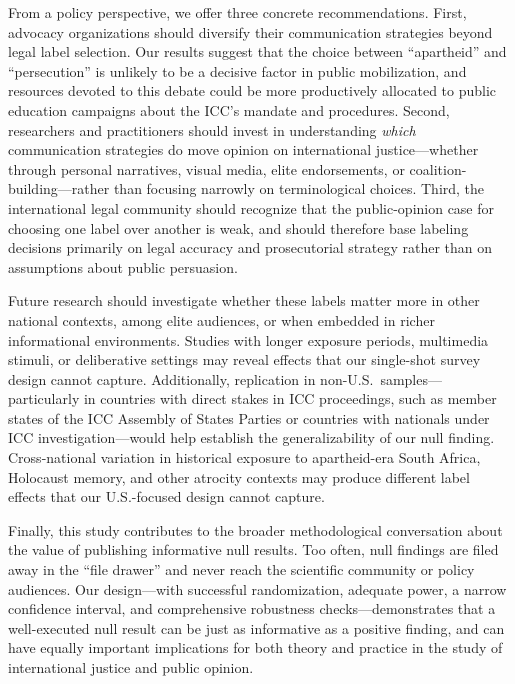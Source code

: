 \documentclass[12pt]{article}
\begin{document}
From a policy perspective, we offer three concrete recommendations. First, advocacy organizations should diversify their communication strategies beyond legal label selection. Our results suggest that the choice between ``apartheid'' and ``persecution'' is unlikely to be a decisive factor in public mobilization, and resources devoted to this debate could be more productively allocated to public education campaigns about the ICC's mandate and procedures. Second, researchers and practitioners should invest in understanding \emph{which} communication strategies do move opinion on international justice---whether through personal narratives, visual media, elite endorsements, or coalition-building---rather than focusing narrowly on terminological choices. Third, the international legal community should recognize that the public-opinion case for choosing one label over another is weak, and should therefore base labeling decisions primarily on legal accuracy and prosecutorial strategy rather than on assumptions about public persuasion.

Future research should investigate whether these labels matter more in other national contexts, among elite audiences, or when embedded in richer informational environments. Studies with longer exposure periods, multimedia stimuli, or deliberative settings may reveal effects that our single-shot survey design cannot capture. Additionally, replication in non-U.S.\ samples---particularly in countries with direct stakes in ICC proceedings, such as member states of the ICC Assembly of States Parties or countries with nationals under ICC investigation---would help establish the generalizability of our null finding. Cross-national variation in historical exposure to apartheid-era South Africa, Holocaust memory, and other atrocity contexts may produce different label effects that our U.S.-focused design cannot capture.

Finally, this study contributes to the broader methodological conversation about the value of publishing informative null results. Too often, null findings are filed away in the ``file drawer'' and never reach the scientific community or policy audiences. Our design---with successful randomization, adequate power, a narrow confidence interval, and comprehensive robustness checks---demonstrates that a well-executed null result can be just as informative as a positive finding, and can have equally important implications for both theory and practice in the study of international justice and public opinion.

\singlespacing


\end{document}

